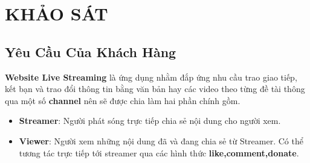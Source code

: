 \chapter{KHẢO SÁT}
\section{Yêu Cầu Của Khách Hàng}
\textbf{Website Live Streaming} là ứng dụng nhằm đắp ứng nhu cầu trao giao tiếp, kết bạn và trao đổi thông tin bằng văn bản hay các video theo từng đề tài thông qua một số \textbf{channel} nên sẽ được chia làm hai phần chính gồm.
 \begin{itemize}
 	\item \textbf{Streamer}: Người phát sóng trực tiếp chia sẻ nội dung cho người xem.
	\item \textbf{Viewer}: Người xem những nội dung đã và đang chia sẻ từ Streamer. Có thể tương tác trực tiếp tới streamer qua các hình thức \textbf{like,comment,donate}.
 \end{itemize}

